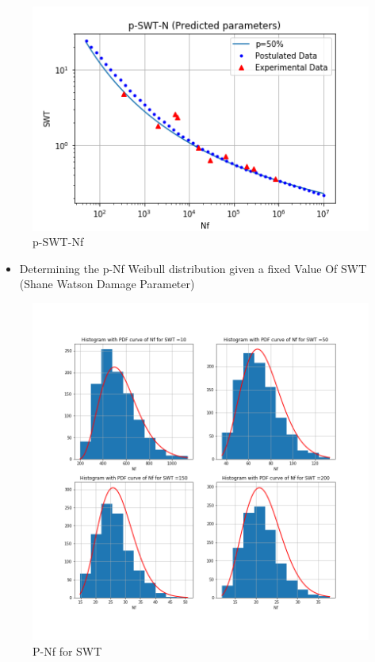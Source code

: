 \documentclass[11pt]{article}
\providecommand{\tightlist}{%
      \setlength{\itemsep}{0pt}\setlength{\parskip}{0pt}}
\begin{document}
\begin{figure}
\centering
\includegraphics{images/p-SWT-Nf_predpara.png}
\caption{p-SWT-Nf}
\end{figure}

\begin{itemize}
\tightlist
\item
  Determining the p-Nf Weibull distribution given a fixed Value Of SWT
  (Shane Watson Damage Parameter)
\end{itemize}

\begin{figure}
\centering
\includegraphics{images/nfswtpdf.png}
\caption{P-Nf for SWT}
\end{figure}
\end{document}
